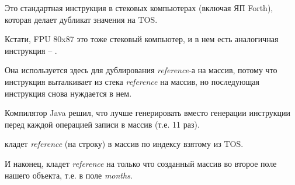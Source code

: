 Это стандартная инструкция в стековых компьютерах (включая ЯП Forth),
которая делает дубликат значения на \ac{TOS}.

Кстати, FPU 80x87 это тоже стековый компьютер, и в нем есть аналогичная инструкция -- .


Она используется здесь для дублирования \emph{reference}-а на массив, 
потому что инструкция  выталкивает из стека \emph{reference} на массив, 
но последующая инструкция  снова нуждается в нем.

Компилятор Java решил, что лучше генерировать  вместо генерации инструкции
 перед каждой операцией записи в массив (т.е. 11 раз).


 кладет \emph{reference} (на строку) в массив по индексу взятому из \ac{TOS}.


И наконец,  кладет \emph{reference} на только что созданный массив во второе поле
нашего объекта, т.е. в поле \emph{months}.
